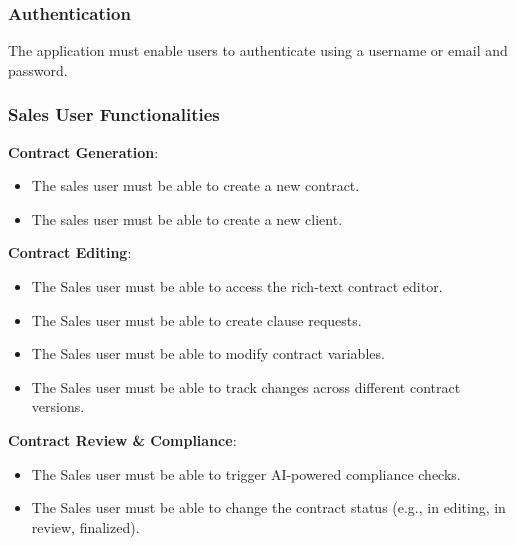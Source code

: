 \subsubsection{Authentication}
The application must enable users to authenticate using a username or email and password.

\subsubsection{Sales User Functionalities}

\textbf{Contract Generation}:\vspace{0.4em}
\begin{adjustwidth}{3em}{1em}
    \begin{itemize}
        \item The sales user must be able to create a new contract.\vspace{0.4em}
        \item The sales user must be able to create a new client.
    \end{itemize}
\end{adjustwidth}\vspace{0.85em}

\textbf{Contract Editing}:\vspace{0.4em}
\begin{adjustwidth}{3em}{1em}
    \begin{itemize}
        \item The Sales user must be able to access the rich-text contract editor.\vspace{0.4em}
        \item The Sales user must be able to create clause requests.\vspace{0.4em}
        \item The Sales user must be able to modify contract variables.\vspace{0.4em}
        \item The Sales user must be able to track changes across different contract versions.  
    \end{itemize}
\end{adjustwidth}\vspace{0.85em} 

\textbf{Contract Review \& Compliance}:\vspace{0.4em}
\begin{adjustwidth}{3em}{1em}
    \begin{itemize}
        \item The Sales user must be able to trigger AI-powered compliance checks.\vspace{0.4em}
        \item The Sales user must be able to change the contract status (e.g., in editing, in review, finalized).
    \end{itemize}
\end{adjustwidth}\vspace{0.85em} 

